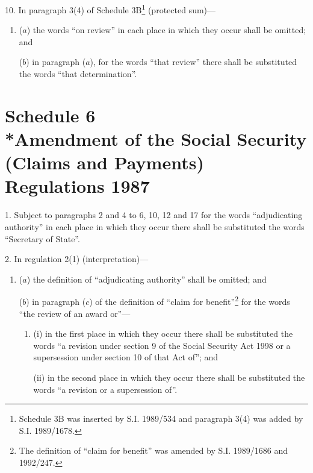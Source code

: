\documentclass[12pt,a4paper]{article}
\begin{document}
\medskip

10.  In paragraph 3(4) of Schedule 3B\footnote{\frenchspacing Schedule 3B was inserted by S.I. 1989/534 and paragraph 3(4) was added by S.I. 1989/1678.} (protected sum)---
\begin{enumerate}\item[]
($a$) the words “on review” in each place in which they occur shall be omitted; and

($b$) in paragraph ($a$), for the words “that review” there shall be substituted the words “that determination”.
\end{enumerate}

\part[Schedule 6 --- Amendment of the Social Security (Claims and Payments) Regulations 1987]{Schedule 6\\*Amendment of the Social Security (Claims and Payments) Regulations 1987}

\renewcommand\parthead{--- Schedule 6}

1.  Subject to paragraphs 2 and 4 to 6, 10, 12 and 17 for the words “adjudicating authority” in each place in which they occur there shall be substituted the words “Secretary of State”.

\medskip

2.  In regulation 2(1) (interpretation)---
\begin{enumerate}\item[]
($a$) the definition of “adjudicating authority” shall be omitted; and

($b$) in paragraph ($c$)  of the definition of “claim for benefit”\footnote{\frenchspacing The definition of “claim for benefit” was amended by S.I. 1989/1686 and 1992/247.} for the words “the review of an award or”---
\begin{enumerate}\item[]
(i) in the first place in which they occur there shall be substituted the words “a revision under section 9 of the Social Security Act 1998 or a supersession under section 10 of that Act of”; and

(ii) in the second place in which they occur there shall be substituted the words “a revision or a supersession of”.
\end{enumerate}
\end{enumerate}

\medskip
\end{document}
